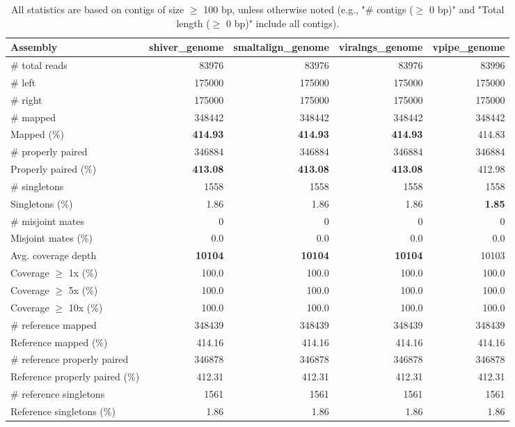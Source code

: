 \documentclass[12pt,a4paper]{article}
\begin{document}
\begin{table}[ht]
\begin{center}
\caption{All statistics are based on contigs of size $\geq$ 100 bp, unless otherwise noted (e.g., "\# contigs ($\geq$ 0 bp)" and "Total length ($\geq$ 0 bp)" include all contigs).}
\begin{tabular}{|l*{4}{|r}|}
\hline
Assembly & shiver\_genome & smaltalign\_genome & viralngs\_genome & vpipe\_genome \\ \hline
\# total reads & 83976 & 83976 & 83976 & 83996 \\ \hline
\# left & 175000 & 175000 & 175000 & 175000 \\ \hline
\# right & 175000 & 175000 & 175000 & 175000 \\ \hline
\# mapped & 348442 & 348442 & 348442 & 348442 \\ \hline
Mapped (\%) & {\bf 414.93} & {\bf 414.93} & {\bf 414.93} & 414.83 \\ \hline
\# properly paired & 346884 & 346884 & 346884 & 346884 \\ \hline
Properly paired (\%) & {\bf 413.08} & {\bf 413.08} & {\bf 413.08} & 412.98 \\ \hline
\# singletons & 1558 & 1558 & 1558 & 1558 \\ \hline
Singletons (\%) & 1.86 & 1.86 & 1.86 & {\bf 1.85} \\ \hline
\# misjoint mates & 0 & 0 & 0 & 0 \\ \hline
Misjoint mates (\%) & 0.0 & 0.0 & 0.0 & 0.0 \\ \hline
Avg. coverage depth & {\bf 10104} & {\bf 10104} & {\bf 10104} & 10103 \\ \hline
Coverage $\geq$ 1x (\%) & 100.0 & 100.0 & 100.0 & 100.0 \\ \hline
Coverage $\geq$ 5x (\%) & 100.0 & 100.0 & 100.0 & 100.0 \\ \hline
Coverage $\geq$ 10x (\%) & 100.0 & 100.0 & 100.0 & 100.0 \\ \hline
\# reference mapped & 348439 & 348439 & 348439 & 348439 \\ \hline
Reference mapped (\%) & 414.16 & 414.16 & 414.16 & 414.16 \\ \hline
\# reference properly paired & 346878 & 346878 & 346878 & 346878 \\ \hline
Reference properly paired (\%) & 412.31 & 412.31 & 412.31 & 412.31 \\ \hline
\# reference singletons & 1561 & 1561 & 1561 & 1561 \\ \hline
Reference singletons (\%) & 1.86 & 1.86 & 1.86 & 1.86 \\ \hline

\end{tabular}
\end{center}
\end{table}
\end{document}
